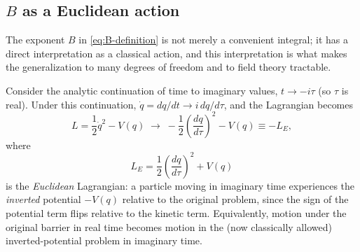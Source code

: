 \subsection{$B$ as a Euclidean action}

The exponent $B$ in \eqref{eq:B-definition} is not merely a convenient integral; it has a direct interpretation as a classical action, and this interpretation is what makes the generalization to many degrees of freedom and to field theory tractable.

Consider the analytic continuation of time to imaginary values, $t \to -i\tau$ (so $\tau$ is real). Under this continuation, $\dot q = dq/dt \to i\, dq/d\tau$, and the Lagrangian becomes
\begin{equation}
L = \frac{1}{2}\dot q^2 - V(q) \;\longrightarrow\; -\frac{1}{2}\left(\frac{dq}{d\tau}\right)^2 - V(q) \equiv -L_E,
\label{eq:wick-rotation}
\end{equation}
where
\begin{equation}
L_E = \frac{1}{2}\left(\frac{dq}{d\tau}\right)^2 + V(q)
\label{eq:euclidean-lagrangian}
\end{equation}
is the \emph{Euclidean} Lagrangian: a particle moving in imaginary time experiences the \emph{inverted} potential $-V(q)$ relative to the original problem, since the sign of the potential term flips relative to the kinetic term. Equivalently, motion under the original barrier in real time becomes motion in the (now classically allowed) inverted-potential problem in imaginary time.

